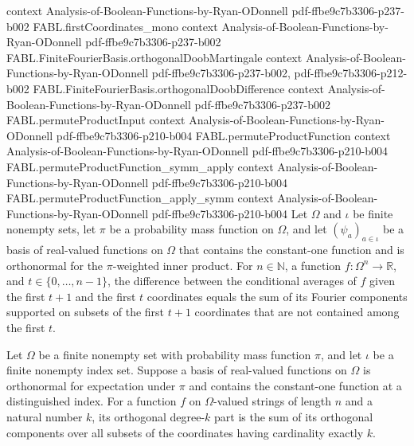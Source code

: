 \begin{theorem}
  {context}
  {Analysis-of-Boolean-Functions-by-Ryan-ODonnell}
  {pdf-ffbe9c7b3306-p237-b002}
\proofstep
  {FABL.firstCoordinates_mono}
  {context}
  {Analysis-of-Boolean-Functions-by-Ryan-ODonnell}
  {pdf-ffbe9c7b3306-p237-b002}
\proofstep
  {FABL.FiniteFourierBasis.orthogonalDoobMartingale}
  {context}
  {Analysis-of-Boolean-Functions-by-Ryan-ODonnell}
  {pdf-ffbe9c7b3306-p237-b002,
    pdf-ffbe9c7b3306-p212-b002}
\proofstep
  {FABL.FiniteFourierBasis.orthogonalDoobDifference}
  {context}
  {Analysis-of-Boolean-Functions-by-Ryan-ODonnell}
  {pdf-ffbe9c7b3306-p237-b002}
\proofstep
  {FABL.permuteProductInput}
  {context}
  {Analysis-of-Boolean-Functions-by-Ryan-ODonnell}
  {pdf-ffbe9c7b3306-p210-b004}
\proofstep
  {FABL.permuteProductFunction}
  {context}
  {Analysis-of-Boolean-Functions-by-Ryan-ODonnell}
  {pdf-ffbe9c7b3306-p210-b004}
\proofstep
  {FABL.permuteProductFunction_symm_apply}
  {context}
  {Analysis-of-Boolean-Functions-by-Ryan-ODonnell}
  {pdf-ffbe9c7b3306-p210-b004}
\proofstep
  {FABL.permuteProductFunction_apply_symm}
  {context}
  {Analysis-of-Boolean-Functions-by-Ryan-ODonnell}
  {pdf-ffbe9c7b3306-p210-b004}
Let $\Omega$ and $\iota$ be finite nonempty sets, let $\pi$ be a probability mass
function on $\Omega$, and let $(\psi_a)_{a\in\iota}$ be a basis of real-valued functions
on $\Omega$ that contains the constant-one function and is orthonormal for the
$\pi$-weighted inner product. For $n\in\mathbb N$, a function $f:\Omega^n\to\mathbb R$,
and $t\in\{0,\ldots,n-1\}$, the difference between the conditional averages of $f$ given
the first $t+1$ and the first $t$ coordinates equals the sum of its Fourier components
supported on subsets of the first $t+1$ coordinates that are not contained among the
first $t$.
\end{theorem}

\begin{definition}
\label{FABL.FiniteFourierBasis.orthogonalDegreePart}
\leanok
{}
Let $\Omega$ be a finite nonempty set with probability mass function $\pi$, and let
$\iota$ be a finite nonempty index set. Suppose a basis of real-valued functions on
$\Omega$ is orthonormal for expectation under $\pi$ and contains the constant-one
function at a distinguished index. For a function $f$ on $\Omega$-valued strings of
length $n$ and a natural number $k$, its orthogonal degree-$k$ part is the sum of its
orthogonal components over all subsets of the coordinates having cardinality exactly $k$.
\end{definition}

